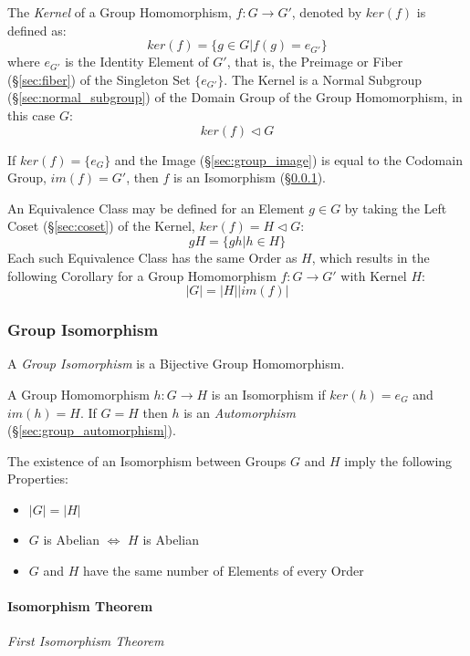 The \emph{Kernel} of a Group Homomorphism, $f : G \rightarrow G'$,
denoted by $ker(f)$ is defined as:
\[
    ker(f) = \{g \in G | f(g) = e_{G'}\}
\]
where $e_{G'}$ is the Identity Element of $G'$, that is, the Preimage
or Fiber (\S\ref{sec:fiber}) of the Singleton Set $\{e_{G'}\}$. The
Kernel is a Normal Subgroup (\S\ref{sec:normal_subgroup}) of the
Domain Group of the Group Homomorphism, in this case $G$:
\[
    ker(f) \triangleleft G
\]

If $ker(f) = \{e_G\}$ and the Image (\S\ref{sec:group_image}) is equal
to the Codomain Group, $im(f) = G'$, then $f$ is an Isomorphism
(\S\ref{sec:group_isomorphism}).

An Equivalence Class may be defined for an Element $g \in G$ by taking
the Left Coset (\S\ref{sec:coset}) of the Kernel, $ker(f) = H
\triangleleft G$:
\[
    gH = \{ gh | h \in H \}
\]
Each such Equivalence Class has the same Order as $H$, which results
in the following Corollary for a Group Homomorphism $f : G \rightarrow
G'$ with Kernel $H$:
\[
    |G| = |H||im(f)|
\]



\subsubsection{Group Isomorphism}\label{sec:group_isomorphism}

A \emph{Group Isomorphism} is a Bijective Group Homomorphism.

A Group Homomorphism $h : G \rightarrow H$ is an Isomorphism if
$ker(h) = e_G$ and $im(h) = H$. If $G = H$ then $h$ is an
\emph{Automorphism} (\S\ref{sec:group_automorphism}).

The existence of an Isomorphism between Groups $G$ and $H$ imply the
following Properties:
\begin{itemize}
    \item $|G| = |H|$
    \item $G$ is Abelian $\Leftrightarrow$ $H$ is Abelian
    \item $G$ and $H$ have the same number of Elements of every Order
\end{itemize}



\paragraph{Isomorphism Theorem}\label{sec:isomorphism_theorem}\hfill

\emph{First Isomorphism Theorem}

